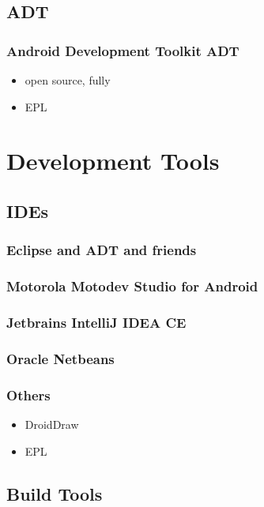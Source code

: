 \documentclass{beamer}
\begin{document}
  \subsection{ADT}
    \begin{frame}
      \frametitle{Android Development Toolkit ADT}
      \begin{itemize}
        \item<1->open source, fully 
        \item<2->EPL
      \end{itemize}
    \end{frame}

\section{Development Tools}

  \subsection{IDEs}

    \begin{frame}
      \frametitle{Eclipse and ADT and friends}
      
    \end{frame}

    \begin{frame}
      \frametitle{Motorola Motodev Studio for Android}
    \end{frame}

    \begin{frame}
      \frametitle{Jetbrains IntelliJ IDEA CE}
    \end{frame}

    \begin{frame}
      \frametitle{Oracle Netbeans}
    \end{frame}

    \begin{frame}
      \frametitle{Others}
        \begin{itemize}
        \item<1->DroidDraw
        \item<2->EPL
      \end{itemize}
    \end{frame}

  \subsection{Build Tools}
\end{document}
